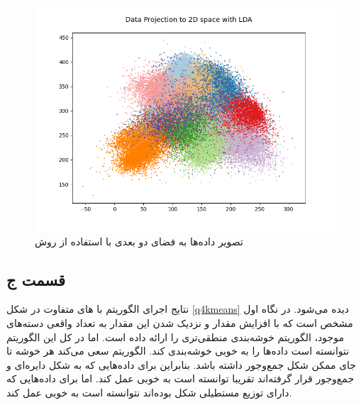 \documentclass[12pt, a4paper]{article}
\begin{document}
\begin{figure}[h]
    \centering
    \includegraphics[width=0.7\linewidth]{images/q4/b/projection_to_2d.png}
    \caption{تصویر داده‌ها به فضای دو بعدی با استفاده از روش }
    \label{lda_projection_2d}
\end{figure}
\clearpage

\subsection*{قسمت ج}

نتایج اجرای الگوریتم  با های متفاوت در شکل \ref{q4kmeans}
دیده می‌شود. در نگاه اول مشخص است که با افزایش مقدار  و
نزدیک شدن این مقدار به تعداد واقعی دسته‌های موجود، الگوریتم خوشه‌بندی
منطقی‌تری را ارائه داده است. اما در کل این الگوریتم نتوانسته است
داده‌ها را به خوبی خوشه‌بندی کند. الگوریتم  سعی می‌کند هر خوشه تا جای
ممکن شکل جمع‌وجور داشته باشد. بنابراین برای داده‌هایی که به
شکل دایره‌ای و جمع‌وجور قرار گرفته‌اند تقریبا توانسته است به
خوبی عمل کند. اما برای داده‌هایی که دارای توزیع مستطیلی شکل بوده‌اند نتوانسته است
به خوبی عمل کند.
\end{document}
